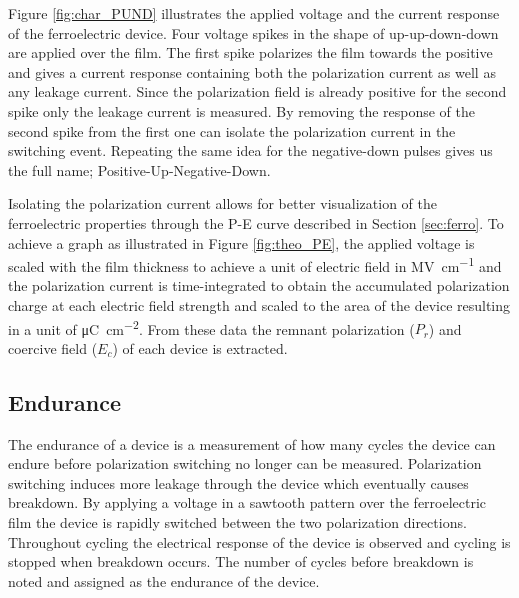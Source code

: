 \documentclass[11pt,twoside]{eitExjobb}
\begin{document}
Figure \ref{fig:char_PUND} illustrates the applied voltage and the current
response of the ferroelectric device. Four voltage spikes in the shape of
up-up-down-down are applied over the film. The first spike polarizes the film
towards the positive and gives a current response containing both the
polarization current as well as any leakage current. Since the polarization
field is already positive for the second spike only the leakage current is
measured. By removing the response of the second spike from the first one can
isolate the polarization current in the switching event. Repeating the same
idea for the negative-down pulses gives us the full name;
Positive-Up-Negative-Down.

Isolating the polarization current allows for better visualization of the
ferroelectric properties through the P-E curve described in Section
\ref{sec:ferro}. To achieve a graph as illustrated in Figure \ref{fig:theo_PE},
the applied voltage is scaled with the film thickness to achieve a unit of
electric field in \si{\mega\volt\per\centi\meter} and the polarization current
is time-integrated to obtain the accumulated polarization charge at each
electric field strength and scaled to the area of the device resulting in a
unit of \si{\micro\coulomb\per\centi\meter\squared}. From these data the
remnant polarization ($P_r$) and coercive field ($E_c$) of each device is
extracted.

\subsection{Endurance}\label{sec:Endu}
The endurance of a device is a measurement of how many cycles the device can
endure before polarization switching no longer can be measured. Polarization
switching induces more leakage through the device which eventually causes
breakdown. %
By applying a voltage in a sawtooth pattern over the ferroelectric film the
device is rapidly switched between the two polarization directions. Throughout
cycling the electrical response of the device is observed and cycling is
stopped when breakdown occurs. The number of cycles before breakdown is noted
and assigned as the endurance of the device.
\end{document}

